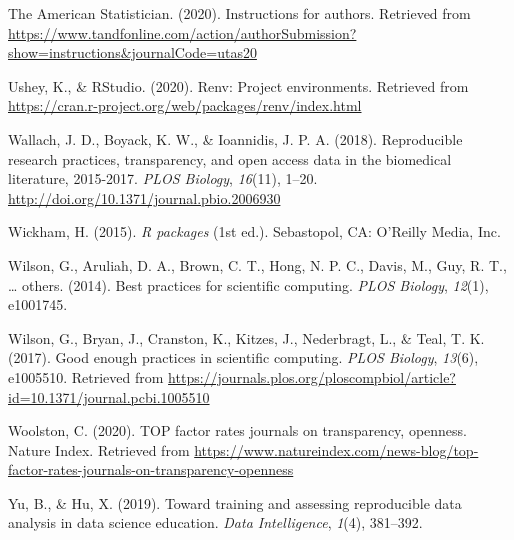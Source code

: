 \documentclass[12pt,twoside]{reedthesis}
\begin{document}
\hypertarget{ref-ams-guide}{}
The American Statistician. (2020). Instructions for authors. Retrieved
from
\url{https://www.tandfonline.com/action/authorSubmission?show=instructions\&journalCode=utas20}

\hypertarget{ref-R-renv}{}
Ushey, K., \& RStudio. (2020). Renv: Project environments. Retrieved
from \url{https://cran.r-project.org/web/packages/renv/index.html}

\hypertarget{ref-plos-biology}{}
Wallach, J. D., Boyack, K. W., \& Ioannidis, J. P. A. (2018).
Reproducible research practices, transparency, and open access data in
the biomedical literature, 2015-2017. \emph{PLOS Biology},
\emph{16}(11), 1--20. \url{http://doi.org/10.1371/journal.pbio.2006930}

\hypertarget{ref-hadley-packages}{}
Wickham, H. (2015). \emph{R packages} (1st ed.). Sebastopol, CA:
O'Reilly Media, Inc.

\hypertarget{ref-wilson2014best}{}
Wilson, G., Aruliah, D. A., Brown, C. T., Hong, N. P. C., Davis, M.,
Guy, R. T., \ldots{} others. (2014). Best practices for scientific
computing. \emph{PLOS Biology}, \emph{12}(1), e1001745.

\hypertarget{ref-wilson2017good}{}
Wilson, G., Bryan, J., Cranston, K., Kitzes, J., Nederbragt, L., \&
Teal, T. K. (2017). Good enough practices in scientific computing.
\emph{PLOS Biology}, \emph{13}(6), e1005510. Retrieved from
\url{https://journals.plos.org/ploscompbiol/article?id=10.1371/journal.pcbi.1005510}

\hypertarget{ref-top-guidelines}{}
Woolston, C. (2020). TOP factor rates journals on transparency,
openness. Nature Index. Retrieved from
\url{https://www.natureindex.com/news-blog/top-factor-rates-journals-on-transparency-openness}

\hypertarget{ref-yu2019toward}{}
Yu, B., \& Hu, X. (2019). Toward training and assessing reproducible
data analysis in data science education. \emph{Data Intelligence},
\emph{1}(4), 381--392.


\end{document}
